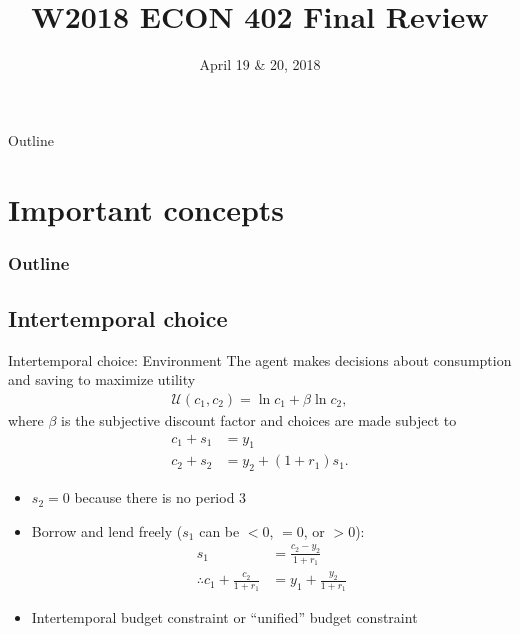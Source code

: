 \documentclass[presentation,dvipsnames]{beamer}
\author{}
\date{April 19 \& 20, 2018}
\title{W2018 ECON 402 Final Review}
\begin{document}
\maketitle
\begin{frame}{Outline}
\tableofcontents
\end{frame}

\section{Important concepts}

\begin{frame}
\frametitle{Outline}
\tableofcontents[currentsection]
\end{frame}

\subsection{Intertemporal choice}
\label{sec-2}

\begin{frame}[label=sec-2-1]{Intertemporal choice: Environment}
The agent makes decisions about consumption and saving to maximize utility
\begin{align*}
\mathcal{U}(c_{1},c_{2}) = \ln c_{1} + \beta \ln c_{2},
\end{align*}
where $\beta$ is the subjective discount factor and choices are made subject to
\begin{align*}
c_{1} + s_{1} &= y_{1} \\
c_{2} + s_{2} &= y_{2} + (1+r_{1})s_{1}.
\end{align*}
\begin{itemize}[label={--}]
\item $s_{2} = 0$ because there is no period 3
\item Borrow and lend freely ($s_{1}$ can be $<0$, $=0$, or $>0$):
\begin{align*}
s_{1} &= \frac{c_{2}-y_{2}}{1+r_{1}} \\
\therefore c_{1} + \frac{c_{2}}{1+r_{1}} &= y_{1} + \frac{y_{2}}{1+r_{1}}
\end{align*}
\item Intertemporal budget constraint or ``unified'' budget constraint
\end{itemize}
\end{frame}
\end{document}
